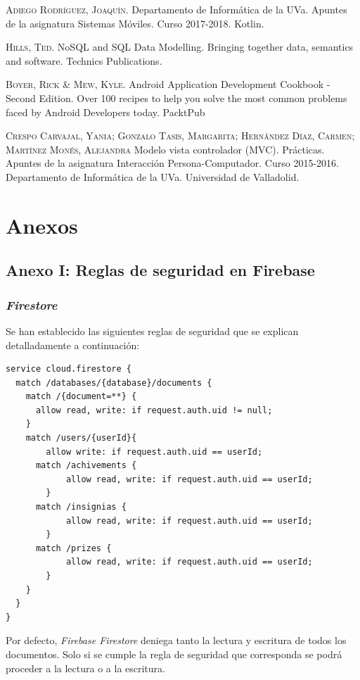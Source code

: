 \documentclass[twoside]{report}
\begin{document}
\begin{thebibliography}{a}
 \textsc{Adiego Rodríguez, Joaquín}. Departamento de Informática de la UVa. Apuntes de la asignatura Sistemas Móviles. Curso 2017-2018. Kotlin.

 \textsc{Hills, Ted}. NoSQL and SQL Data Modelling. Bringing together data, semantics and software. Technics Publications.

 \textsc{Boyer, Rick \& Mew, Kyle}. Android Application Development Cookbook - Second Edition. Over 100 recipes to help you solve the most common problems faced by Android Developers today. PacktPub

 \textsc{Crespo Carvajal, Yania; Gonzalo Tasis, Margarita; Hernández Díaz, Carmen; Martínez Monés, Alejandra} Modelo vista controlador (MVC). Prácticas. Apuntes de la asignatura Interacción Persona-Computador. Curso 2015-2016. Departamento de Informática de la UVa. Universidad de Valladolid. 

\end{thebibliography}

\part{Anexos}

\chapter*{Anexo I: Reglas de seguridad en Firebase}
\section*{\textit{Firestore}}
Se han establecido las siguientes reglas de seguridad que se explican detalladamente a continuación:

\begin{lstlisting}
service cloud.firestore {
  match /databases/{database}/documents {
    match /{document=**} {
      allow read, write: if request.auth.uid != null;
    }
    match /users/{userId}{
    	allow write: if request.auth.uid == userId;
      match /achivements {
    		allow read, write: if request.auth.uid == userId;
    	}
      match /insignias {
    		allow read, write: if request.auth.uid == userId;
    	}
      match /prizes {
    		allow read, write: if request.auth.uid == userId;
    	}
    }
  }
}
\end{lstlisting}

Por defecto, \textit{Firebase Firestore} deniega tanto la lectura y escritura de todos los documentos. Solo si se cumple la regla de seguridad que corresponda se podrá proceder a la lectura o a la escritura. \\
\end{document}
